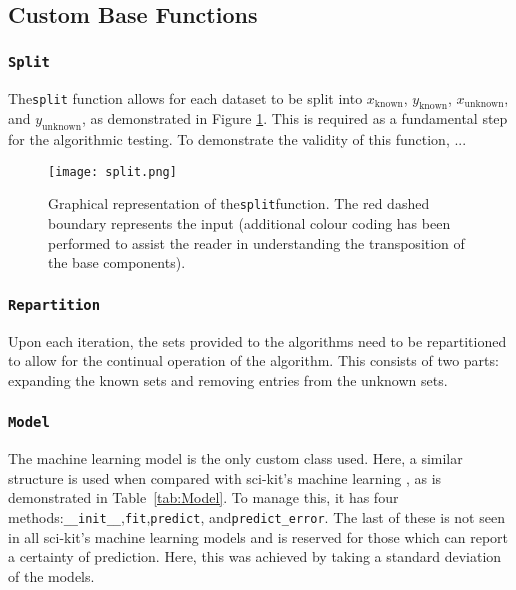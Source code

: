 \subsection{Custom Base Functions}
\subsubsection{\lstinline{Split}}
The\lstinline{split} function allows for each dataset to be split into $x_\mathrm{known}$, $y_\mathrm{known}$, $x_\mathrm{unknown}$, and $y_\mathrm{unknown}$, as demonstrated in Figure \ref{fig:Split}. This is required as a fundamental step for the algorithmic testing. To demonstrate the validity of this function, ...

    \begin{figure}
        \begin{center}
            \texttt{[image: split.png]}
        \end{center}
        \caption[Representation of the split function]{Graphical representation of the\lstinline{split}function. The red dashed boundary represents the input (additional colour coding has been performed to assist the reader in understanding the transposition of the base components).}
        \label{fig:Split}
    \end{figure}


    \subsubsection{\lstinline{Repartition}}
    Upon each iteration, the sets provided to the algorithms need to be repartitioned to allow for the continual operation of the algorithm. This consists of two parts: expanding the known sets and removing entries from the unknown sets.

    \subsubsection{\lstinline{Model}}
    The machine learning model is the only custom class used. Here, a similar structure is used when compared with sci-kit's machine learning \cite{scikit}, as is demonstrated in Table~\ref{tab:Model}. To manage this, it has four methods:\lstinline{__init__},\lstinline{fit},\lstinline{predict}, and\lstinline{predict_error}. The last of these is not seen in all sci-kit's machine learning models and is reserved for those which can report a certainty of prediction. Here, this was achieved by taking a standard deviation of the models.

